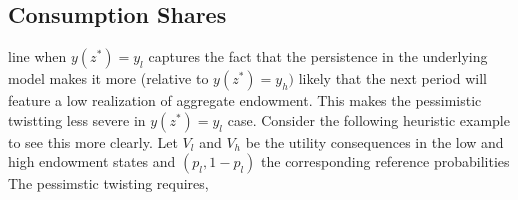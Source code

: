 \documentclass[12pt]{article}
\begin{document}
\subsection{Consumption Shares}
line when $y(z^*)=y_l$ captures the fact that the persistence  in the underlying model makes it more (relative to $y(z^*)=y_h)$ likely that the next period will feature a low realization of aggregate endowment. This makes the pessimistic twistting less severe in $y(z^*)=y_l$ case. Consider the following heuristic example to see this more clearly. Let $V_l$ and $V_h$ be the utility consequences in the low and high endowment states and $(p_l,1-p_l)$ the corresponding reference probabilities The pessimstic twisting requires, 
\end{document}

